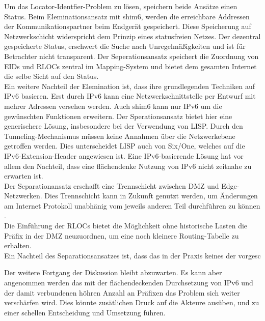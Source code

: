Um das Locator-Identfier-Problem zu lösen, speichern beide Ansätze einen Status. Beim Eleminationsansatz mit shim6, werden die erreichbare Addressen der Kommunikationspartner beim Endgerät gespeichert. Diese Speicherung auf Netzwerkschicht widerspricht dem Prinzip eines statusfreien Netzes. Der dezentral gespeicherte Status, erschwert die Suche nach Unregelmäßigkeiten und ist für Betrachter nicht transparent. Der Seperationsansatz speichert die Zuordnung von EIDs und RLOCs zentral im Mapping-System und bietet dem gesamten Internet die selbe Sicht auf den Status. \\
Ein weitere Nachteil der Elemination ist, dass ihre grundlegenden Techniken auf IPv6 basieren. Erst durch IPv6 kann eine Netzwerkschnittstelle per Entwurf mit mehrer Adressen versehen werden. Auch shim6 kann nur IPv6 um die gewünschten Funktionen erweitern. Der Sperationsansatz bietet hier eine generischere Lösung, insbesondere bei der Verwendung von LISP. Durch den Tunneling-Mechanismus müssen keine Annahmen über die Netzwerkebene getroffen werden. Dies unterscheidet LISP auch von Six/One, welches auf die IPv6-Extension-Header angewiesen ist. Eine IPv6-basierende Lösung hat vor allem den Nachteil, dass eine flächendenke Nutzung von IPv6 nicht zeitnahe zu erwarten ist. \\
Der Separationansatz erschafft eine Trennschicht zwischen DMZ und Edge-Netzwerken. Dies Trennschicht kann in Zukunft genutzt werden, um Änderungen am Internet Protokoll unabhänig vom jeweils anderen Teil durchführen zu können \cite{jen:2008:start}. \\
Die Einführung der RLOCs bietet die Möglichkeit ohne historische Lasten die Präfix in der DMZ neuzuordnen, um eine noch kleinere Routing-Tabelle zu erhalten. \\
Ein Nachteil des Separationsansatzes ist, dass das in der Praxis keines der vorgesc

Der weitere Fortgang der Diskussion bleibt abzuwarten. Es kann aber angenommen werden das mit der flächendeckenden Durchsetzung von IPv6 und der damit verbundenen höhren Anzahl an Präfixen das Problem sich weiter verschärfen wird. Dies könnte zusätlichen Druck auf die Akteure ausüben, und zu einer schellen Entscheidung und Umsetzung führen.



